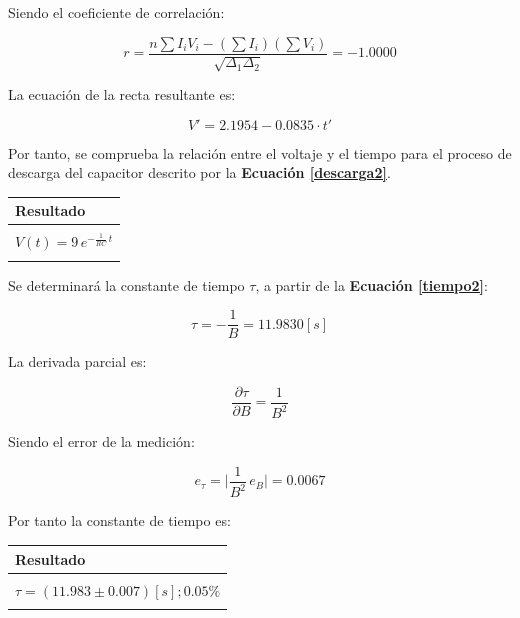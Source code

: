 \documentclass[letter,11pt]{article}
\begin{document}
Siendo el coeficiente de correlación:

\begin{equation*}
    r = \frac{n \sum I_i V_i - (\sum I_i)(\sum V_i)}{\sqrt{\Delta_1 \Delta_2}} = -1.0000
\end{equation*}

La ecuación de la recta resultante es:

\begin{equation*}
    V' = 2.1954 - 0.0835 \cdot t'
\end{equation*}

Por tanto, se comprueba la relación entre el voltaje y el tiempo para el proceso
de descarga del capacitor descrito por la \textbf{Ecuación \ref{descarga2}}.

\begin{center}
\begin{tabular}{|>{\centering}m{9.2cm}<{\centering}|}
\hline
\textbf{Resultado} 
\tabularnewline \hline
\\
\Large{$V(t) = 9\,e^{-\frac{1}{RC}\,t}$} \tabularnewline
\\
\hline
\end{tabular}
\end{center}

Se determinará la constante de tiempo $\tau$, a partir de la
\textbf{Ecuación \ref{tiempo2}}:

\begin{equation*}
    \tau = - \frac{1}{B} = 11.9830 [s]
\end{equation*}

La derivada parcial es:

\begin{equation*}
    \frac{\partial \tau}{\partial B} = \frac{1}{B^2}
\end{equation*}

Siendo el error de la medición:

\begin{equation*}
    e_{\tau} = \Biggr| \frac{1}{B^2}\,e_B \Biggr| = 0.0067
\end{equation*}

Por tanto la constante de tiempo es:

\begin{center}
\begin{tabular}{|>{\centering}m{12.0cm}<{\centering}|}
\hline
\textbf{Resultado}
\tabularnewline \hline
\\
    $\tau = (11.983 \pm 0.007)[s]; 0.05\%$ \tabularnewline
\\
\hline
\end{tabular}
\end{center}
\end{document}
